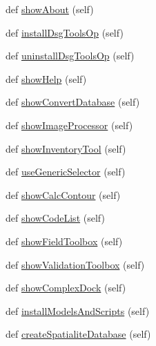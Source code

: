\begin{DoxyCompactItemize}
def \mbox{\hyperlink{class_dsg_tools_1_1dsg__tools_1_1_dsg_tools_a9040f837b61d2ecf1be25d3b2d0e1094}{show\+About}} (self)
\item 
def \mbox{\hyperlink{class_dsg_tools_1_1dsg__tools_1_1_dsg_tools_a53ac2afe989a426adbc3a2e488e5ddb5}{install\+Dsg\+Tools\+Op}} (self)
\item 
def \mbox{\hyperlink{class_dsg_tools_1_1dsg__tools_1_1_dsg_tools_a3110b80e4009faa9ca49631bc96147eb}{uninstall\+Dsg\+Tools\+Op}} (self)
\item 
def \mbox{\hyperlink{class_dsg_tools_1_1dsg__tools_1_1_dsg_tools_a11b6c84296f2542f676586db2125d2d7}{show\+Help}} (self)
\item 
def \mbox{\hyperlink{class_dsg_tools_1_1dsg__tools_1_1_dsg_tools_a81bc3b864b7a3db7781403ecda33b91d}{show\+Convert\+Database}} (self)
\item 
def \mbox{\hyperlink{class_dsg_tools_1_1dsg__tools_1_1_dsg_tools_a183fb5ffe42d20a7d8ee6d7487c47d11}{show\+Image\+Processor}} (self)
\item 
def \mbox{\hyperlink{class_dsg_tools_1_1dsg__tools_1_1_dsg_tools_a9474a90cfdf5723b78a2a7f36ac12065}{show\+Inventory\+Tool}} (self)
\item 
def \mbox{\hyperlink{class_dsg_tools_1_1dsg__tools_1_1_dsg_tools_ade2883e6962e4961c6e57893974e6cd2}{use\+Generic\+Selector}} (self)
\item 
def \mbox{\hyperlink{class_dsg_tools_1_1dsg__tools_1_1_dsg_tools_a0b23a5c6211556c29aeccba77b404a90}{show\+Calc\+Contour}} (self)
\item 
def \mbox{\hyperlink{class_dsg_tools_1_1dsg__tools_1_1_dsg_tools_a7fdaafbd56834d50d0b04170c5c93acd}{show\+Code\+List}} (self)
\item 
def \mbox{\hyperlink{class_dsg_tools_1_1dsg__tools_1_1_dsg_tools_a3638a2d1b3ab271a70989d2586af9d41}{show\+Field\+Toolbox}} (self)
\item 
def \mbox{\hyperlink{class_dsg_tools_1_1dsg__tools_1_1_dsg_tools_aba5782d2c3d5a44dfc69e9111e3c589f}{show\+Validation\+Toolbox}} (self)
\item 
def \mbox{\hyperlink{class_dsg_tools_1_1dsg__tools_1_1_dsg_tools_a2a6302cf6e4fe28b23ffbf9ae6688f1c}{show\+Complex\+Dock}} (self)
\item 
def \mbox{\hyperlink{class_dsg_tools_1_1dsg__tools_1_1_dsg_tools_a3487d8769e5ad8651de6d83104332d52}{install\+Models\+And\+Scripts}} (self)
\item 
def \mbox{\hyperlink{class_dsg_tools_1_1dsg__tools_1_1_dsg_tools_a5beaf05173d7a7150624c677df0d2af3}{create\+Spatialite\+Database}} (self)

\end{DoxyCompactItemize}
